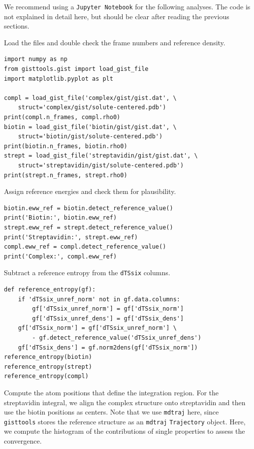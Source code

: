 \documentclass[9pt,tutorial]{livecoms}
\newcommand{\software}{\texttt}
\newcommand\inlinecode{\texttt}
\begin{document}
We recommend using a \software{Jupyter Notebook} for the following analyses.
The code is not explained in detail here, but should be clear after reading the previous sections.

Load the files and double check the frame numbers and reference density.
\begin{lstlisting}[style=python]
import numpy as np
from gisttools.gist import load_gist_file
import matplotlib.pyplot as plt

compl = load_gist_file('complex/gist/gist.dat', \
    struct='complex/gist/solute-centered.pdb')
print(compl.n_frames, compl.rho0)
biotin = load_gist_file('biotin/gist/gist.dat', \
    struct='biotin/gist/solute-centered.pdb')
print(biotin.n_frames, biotin.rho0)
strept = load_gist_file('streptavidin/gist/gist.dat', \
    struct='streptavidin/gist/solute-centered.pdb')
print(strept.n_frames, strept.rho0)
\end{lstlisting}

Assign reference energies and check them for plausibility.

\begin{lstlisting}[style=python]
biotin.eww_ref = biotin.detect_reference_value()
print('Biotin:', biotin.eww_ref)
strept.eww_ref = strept.detect_reference_value()
print('Streptavidin:', strept.eww_ref)
compl.eww_ref = compl.detect_reference_value()
print('Complex:', compl.eww_ref)
\end{lstlisting}

Subtract a reference entropy from the \inlinecode{dTSsix} columns.

\begin{lstlisting}[style=python]
def reference_entropy(gf):
    if 'dTSsix_unref_norm' not in gf.data.columns:
        gf['dTSsix_unref_norm'] = gf['dTSsix_norm']
        gf['dTSsix_unref_dens'] = gf['dTSsix_dens']
    gf['dTSsix_norm'] = gf['dTSsix_unref_norm'] \
        - gf.detect_reference_value('dTSsix_unref_dens')
    gf['dTSsix_dens'] = gf.norm2dens(gf['dTSsix_norm'])
reference_entropy(biotin)
reference_entropy(strept)
reference_entropy(compl)
\end{lstlisting}

Compute the atom positions that define the integration region.
For the streptavidin integral, we align the complex structure onto streptavidin and then use the biotin positions as centers. Note that we use \software{mdtraj} here, since \software{gisttools} stores the reference structure as an \software{mdtraj} \inlinecode{Trajectory} object.
Here, we compute the histogram of the contributions of single properties to assess the convergence.
\end{document}
